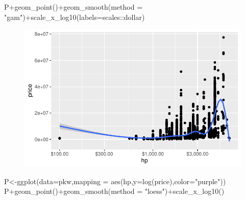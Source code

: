 \documentclass[
  letterpaper,
  DIV=11,
  numbers=noendperiod]{scrartcl}
\newenvironment{Shaded}{\begin{snugshade}}{\end{snugshade}}
\newcommand{\AttributeTok}[1]{\textcolor[rgb]{0.40,0.45,0.13}{#1}}
\newcommand{\FunctionTok}[1]{\textcolor[rgb]{0.28,0.35,0.67}{#1}}
\newcommand{\NormalTok}[1]{\textcolor[rgb]{0.00,0.23,0.31}{#1}}
\newcommand{\OtherTok}[1]{\textcolor[rgb]{0.00,0.23,0.31}{#1}}
\newcommand{\SpecialCharTok}[1]{\textcolor[rgb]{0.37,0.37,0.37}{#1}}
\newcommand{\StringTok}[1]{\textcolor[rgb]{0.13,0.47,0.30}{#1}}
\begin{document}
\begin{Shaded}
\begin{Highlighting}[]


\NormalTok{P}\SpecialCharTok{+}\FunctionTok{geom\_point}\NormalTok{()}\SpecialCharTok{+}\FunctionTok{geom\_smooth}\NormalTok{(}\AttributeTok{method =} \StringTok{"gam"}\NormalTok{)}\SpecialCharTok{+}\FunctionTok{scale\_x\_log10}\NormalTok{(}\AttributeTok{labels=}\NormalTok{scales}\SpecialCharTok{::}\NormalTok{dollar)}
\end{Highlighting}
\end{Shaded}

\begin{figure}[H]

{\centering \includegraphics[width=17.1875in,height=\textheight]{pakwheels_files/figure-pdf/unnamed-chunk-29-4.pdf}

}

\end{figure}

\begin{Shaded}
\begin{Highlighting}[]


\NormalTok{P}\OtherTok{\textless{}{-}}\FunctionTok{ggplot}\NormalTok{(}\AttributeTok{data=}\NormalTok{pkw,}\AttributeTok{mapping =} \FunctionTok{aes}\NormalTok{(hp,}\AttributeTok{y=}\FunctionTok{log}\NormalTok{(price),}\AttributeTok{color=}\StringTok{"purple"}\NormalTok{))}
\NormalTok{P}\SpecialCharTok{+}\FunctionTok{geom\_point}\NormalTok{()}\SpecialCharTok{+}\FunctionTok{geom\_smooth}\NormalTok{(}\AttributeTok{method =} \StringTok{"loess"}\NormalTok{)}\SpecialCharTok{+}\FunctionTok{scale\_x\_log10}\NormalTok{()}
\end{Highlighting}
\end{Shaded}
\end{document}
